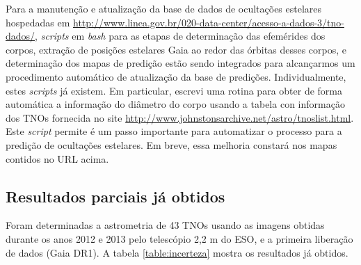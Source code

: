 \documentclass[a4paper, 11pt]{article}
\begin{document}
Para a manutenção e atualização da base de dados de ocultações estelares hospedadas em \url{http://www.linea.gov.br/020-data-center/acesso-a-dados-3/tno-dados/}, {\it scripts} em {\it bash} para as etapas de determinação das efemérides dos corpos, extração de posições estelares Gaia ao redor das órbitas desses corpos, e determinação dos mapas de predição estão sendo integrados para alcançarmos um procedimento automático de atualização da base de predições. Individualmente, estes {\it scripts} já existem. Em particular, escrevi uma rotina para obter de forma automática a informação do diâmetro do corpo usando a tabela con informação dos TNOs fornecida no site \url{http://www.johnstonsarchive.net/astro/tnoslist.html}. Este \textit{script} permite é um passo importante para automatizar o processo para a predição de ocultações estelares. Em breve, essa melhoria constará nos mapas contidos no URL acima.

\subsection{Resultados parciais já obtidos}

Foram determinadas a astrometria de 43 TNOs usando as imagens obtidas durante os anos 2012 e 2013 pelo telescópio 2,2 m do ESO, e a primeira liberação de dados (Gaia DR1). A tabela \ref{table:incerteza} mostra os resultados já obtidos.  
\end{document}
